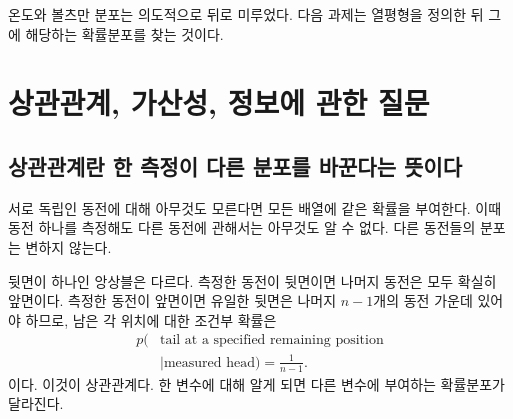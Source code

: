 \begin{classroomqa}
\end{classroomqa}

온도와 볼츠만 분포는 의도적으로 뒤로 미루었다. 다음 과제는 열평형을 정의한 뒤 그에 해당하는 확률분포를 찾는 것이다.

\section{상관관계, 가산성, 정보에 관한 질문}

\subsection{상관관계란 한 측정이 다른 분포를 바꾼다는 뜻이다}

서로 독립인 동전에 대해 아무것도 모른다면 모든 배열에 같은 확률을 부여한다. 이때 동전 하나를 측정해도 다른 동전에 관해서는 아무것도 알 수 없다. 다른 동전들의 분포는 변하지 않는다.

뒷면이 하나인 앙상블은 다르다. 측정한 동전이 뒷면이면 나머지 동전은 모두 확실히 앞면이다. 측정한 동전이 앞면이면 유일한 뒷면은 나머지 \(n-1\)개의 동전 가운데 있어야 하므로, 남은 각 위치에 대한 조건부 확률은
\begin{equation}
\begin{aligned}
 p(&\text{tail at a specified remaining position}\\
   &\mid\text{measured head})=\frac{1}{n-1}.
\end{aligned}
 \label{eq:sm1-conditional-tail}
\end{equation}
이다. 이것이 상관관계다. 한 변수에 대해 알게 되면 다른 변수에 부여하는 확률분포가 달라진다.

\begin{classroomqa}
\end{classroomqa}

